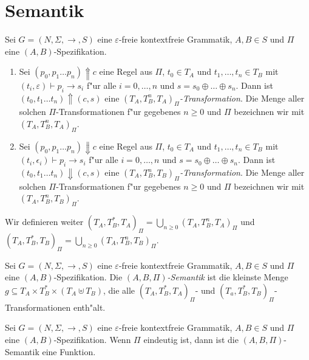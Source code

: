 \documentclass[12pt,a4paper]{article}
\begin{document}
\pagebreak


\section{Semantik}

\begin{definition}[Transformationen]
  Sei $G=(N,\Sigma,\to,S)$ eine $\varepsilon$-freie kontextfreie Grammatik, $A,B \in S$ und
  $\Pi$ eine $(A,B)$-Spezifikation.
  \begin{enumerate}
  \item Sei $(p_0,p_1 \ldots p_n) \Uparrow c$ eine Regel aus $\Pi$, $t_0 \in T_A$ und $t_1,\ldots,t_n \in T_B$
    mit $(t_i,\varepsilon) \vdash p_i \to s_i$ f"ur alle $i = 0,\ldots,n$ und $s = s_0 \oplus \ldots \oplus s_n$.
    Dann ist $(t_0,t_1 \ldots t_n) \Uparrow (c,s)$ eine \emph{$(T_A,T_B^n,T_A)_\Pi$-Transformation}. Die Menge aller
    solchen $\Pi$-Transformationen f"ur gegebenes $n \ge 0$ und $\Pi$ bezeichnen wir mit $(T_A,T_B^n,T_A)_\Pi$.
  \item Sei $(p_0,p_1 \ldots p_n) \Downarrow c$ eine Regel aus $\Pi$, $t_0 \in T_A$ und $t_1,\ldots,t_n \in T_B$
    mit $(t_i,\epsilon_i) \vdash p_i \to s_i$ f"ur alle $i = 0,\ldots,n$ und $s = s_0 \oplus \ldots \oplus s_n$.
    Dann ist $(t_0,t_1 \ldots t_n) \Downarrow (c,s)$ eine \emph{$(T_A,T_B^n,T_B)_\Pi$-Transformation}. Die Menge aller
    solchen $\Pi$-Transformationen f"ur gegebenes $n \ge 0$ und $\Pi$ bezeichnen wir mit $(T_A,T_B^n,T_B)_\Pi$.
  \end{enumerate}
  Wir definieren weiter $(T_A,T_B^*,T_A)_\Pi=\bigcup_{n \ge 0}(T_A,T_B^n,T_A)_\Pi$ und \\
  $(T_A,T_B^*,T_B)_\Pi=\bigcup_{n \ge 0}(T_A,T_B^n,T_B)_\Pi$.
\end{definition}

\begin{definition}[Semantik]
  Sei $G=(N,\Sigma,\to,S)$ eine $\varepsilon$-freie kontextfreie Grammatik, $A,B \in S$
  und $\Pi$ eine $(A,B)$-Spezifikation. Die \emph{$(A,B,\Pi)$-Semantik} ist die kleinste
  Menge $g \subseteq T_A \times T_B^* \times (T_A \uplus T_B)$, die alle $(T_A,T_B^*,T_A)_\Pi$- und
  $(T_a,T_B^*,T_B)_\Pi$-Transformationen enth"alt.
\end{definition}

\begin{lemma}
  Sei $G=(N,\Sigma,\to,S)$ eine $\varepsilon$-freie kontextfreie Grammatik, $A,B \in S$
  und $\Pi$ eine $(A,B)$-Spezifikation. Wenn $\Pi$ eindeutig ist, dann ist die
  $(A,B,\Pi)$-Semantik eine Funktion.
\end{lemma}
\end{document}
